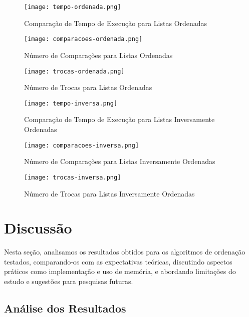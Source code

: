 \documentclass[a4paper,12pt]{article}
\begin{document}
\begin{figure}
    \centering
    \texttt{[image: tempo-ordenada.png]}
    \caption{Comparação de Tempo de Execução para Listas Ordenadas}
    \label{fig:enter-label}
\end{figure}

\begin{figure}
    \centering
    \texttt{[image: comparacoes-ordenada.png]}
    \caption{Número de Comparações para Listas Ordenadas}
    \label{fig:enter-label}
\end{figure}

\begin{figure}
    \centering
    \texttt{[image: trocas-ordenada.png]}
    \caption{Número de Trocas para Listas Ordenadas}
    \label{fig:enter-label}
\end{figure}

\begin{figure}
    \centering
    \texttt{[image: tempo-inversa.png]}
    \caption{Comparação de Tempo de Execução para Listas Inversamente Ordenadas}
    \label{fig:enter-label}
\end{figure}

\begin{figure}
    \centering
    \texttt{[image: comparacoes-inversa.png]}
    \caption{Número de Comparações para Listas Inversamente Ordenadas}
    \label{fig:enter-label}
\end{figure}

\begin{figure}
    \centering
    \texttt{[image: trocas-inversa.png]}
    \caption{Número de Trocas para Listas Inversamente Ordenadas}
    \label{fig:enter-label}
\end{figure}

\newpage
\section{Discussão}

Nesta seção, analisamos os resultados obtidos para os algoritmos de ordenação testados, comparando-os com as expectativas teóricas, discutindo aspectos práticos como implementação e uso de memória, e abordando limitações do estudo e sugestões para pesquisas futuras.

\subsection{Análise dos Resultados}
\end{document}
